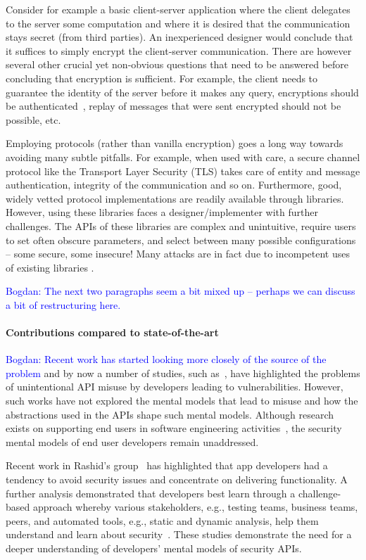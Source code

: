\documentclass[10pt]{article}
\newcommand{\bw}[1]{{\textcolor{blue} {Bogdan: #1}}}
\begin{document}
Consider for example a basic client-server application where the client delegates to the server some computation and where it is desired that the communication stays secret (from third parties).
An inexperienced designer would conclude that it suffices to simply encrypt the client-server communication. 
There are however several other crucial yet non-obvious questions that need to be answered before concluding that  encryption is sufficient. 
For example, the client needs to guarantee the identity of the server before it makes any query, encryptions should be authenticated~\cite{BN08}, replay of messages that were sent encrypted should not be possible, etc. 

Employing protocols (rather than vanilla encryption) goes a long way towards avoiding many subtle pitfalls.  
For example, when used with care, a secure channel protocol like the Transport Layer Security (TLS) takes care of entity and message authentication, integrity of the communication and so on.  Furthermore, good, widely vetted protocol implementations are readily available through libraries.  However, using these libraries faces a designer/implementer with further challenges.   The APIs of these libraries are complex and unintuitive, require users to set often obscure parameters, and select between many possible configurations -- some secure, some insecure!  Many attacks are in fact due to incompetent uses of existing libraries  \cite{GIJABS12}. 

\bw{The next two paragraphs seem a bit mixed up -- perhaps we can discuss a bit of restructuring here.}

\paragraph{Contributions compared to state-of-the-art} 
\bw{Recent work has started looking more closely of the source of the problem}
 and by now a number of studies, such as~\cite{enck2011, fahl2012, fischer2017}, have highlighted the problems of unintentional API misuse by developers leading to vulnerabilities. However, such works have not explored the mental models that lead to misuse and how the abstractions used in the APIs shape such mental models. Although research exists on supporting end users in software engineering activities~\cite{ko2011}, the security mental models of end user developers remain unaddressed. 

Recent work in Rashid's group~\cite{weir2016} has highlighted that app developers had a tendency to avoid security issues and concentrate on delivering functionality. A further analysis demonstrated that developers best learn through a challenge-based approach whereby various stakeholders, e.g., testing teams, business teams, peers, and automated tools, e.g., static and dynamic analysis, help them understand and learn about security~\cite{weir2017}. These studies demonstrate the need for a deeper understanding of developers' mental models of security APIs. 
\end{document}
